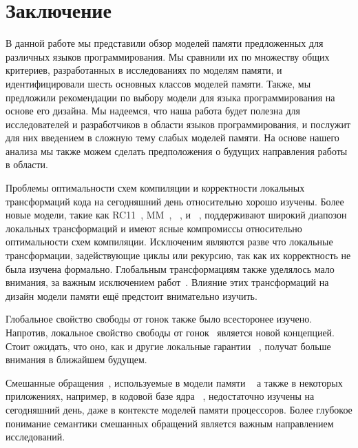 \section{Заключение}
\label{sec:conclusion}

В данной работе мы представили обзор моделей памяти 
предложенных для различных языков программирования. 
Мы сравнили их по множеству общих критериев, 
разработанных в исследованиях по моделям памяти, 
и идентифицировали шесть основных классов моделей памяти. 
Также, мы предложили рекомендации по выбору модели 
для языка программирования на основе его дизайна. 
Мы надеемся, что наша работа будет полезна 
для исследователей и разработчиков в области языков программирования, 
и послужит для них введением в сложную тему слабых моделей памяти. 
На основе нашего анализа мы также можем сделать предположения 
о будущих направления работы в области. 

Проблемы оптимальности схем компиляции и корректности локальных трансформаций кода 
на сегодняшний день относительно хорошо изучены.
Более новые модели, такие как 
RC11~\cite{Lahav-al:PLDI17}, \OCaml MM~\cite{Dolan-al:PLDI18},
\Promising~\cite{Kang-al:POPL17,Lee-al:PLDI20},
и \Weakestmo~\cite{Chakraborty-Vafeiadis:POPL19},
поддерживают широкий диапозон локальных трансформаций 
и имеют ясные компромиссы относительно оптимальности схем компиляции. 
Исключеним являются разве что локальные трансформации, 
задействующие циклы или рекурсию, так как их корректность не была изучена формально. 
Глобальным трансформациям также уделялось мало внимания, 
за важным исключением работ~\cite{PichonPharabod-Sewell:POPL16, Lee-al:PLDI20}.
Влияние этих трансформаций на дизайн модели памяти 
ещё предстоит внимательно изучить.

Глобальное свойство свободы от гонок также было всесторонее изучено. 
Напротив, локальное свойство свободы от гонок~\cite{Dolan-al:PLDI18}  
является новой концепцией. 
Стоит ожидать, что оно, как и другие локальные гарантии~%
\cite{Dodds-al:ESOP18, Jagadeesan-al:OOPSLA2020, Cho-al:PLDI21}, 
получат больше внимания в ближайшем будущем. 

Смешанные обращения~\cite{Flur-al:POPL17}, 
используемые в модели памяти \JS~\cite{Watt-al:PLDI2020} 
а также в некоторых приложениях, например, в кодовой базе 
ядра \Linux~\cite{Flur-al:POPL17},
недостаточно изучены на сегодняшний день, 
даже в контексте моделей памяти процессоров. 
Более глубокое понимание семантики смешанных обращений 
является важным направлением исследований. 

